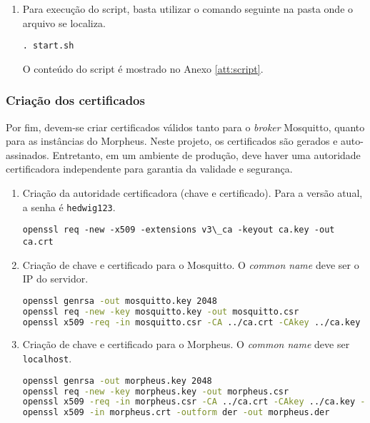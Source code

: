 \begin{enumerate}
\textbf{passwd}

\begin{lstlisting}[language=bash]
    0002D3D7:135876
    01344682:374028
    000750A1:524708
    001A1B07:321115
    0014BB3E:147203
    asd561asd5asd984faee:852456987
\end{lstlisting}

\item Para execução do script, basta utilizar o comando seguinte na pasta onde o arquivo se localiza.

\lstinline{. start.sh}

O conteúdo do script é mostrado no Anexo \ref{att:script}.
\end{enumerate}

\subsubsection{Criação dos certificados}

Por fim, devem-se criar certificados válidos tanto para o \emph{broker} Mosquitto, quanto para as instâncias do Morpheus. Neste projeto, os certificados são gerados e auto-assinados. Entretanto, em um ambiente de produção, deve haver uma autoridade certificadora independente para garantia da validade e segurança.

\begin{enumerate}
\item
Criação da autoridade certificadora (chave e certificado). Para a versão atual, a senha é \texttt{hedwig123}.

\lstinline{openssl req -new -x509 -extensions v3\_ca -keyout ca.key -out ca.crt}
\item
Criação de chave e certificado para o Mosquitto. O \emph{common name} deve ser o IP do servidor.

\begin{lstlisting}[language=bash]
openssl genrsa -out mosquitto.key 2048
openssl req -new -key mosquitto.key -out mosquitto.csr
openssl x509 -req -in mosquitto.csr -CA ../ca.crt -CAkey ../ca.key -CAcreateserial -out mosquitto.crt -days 3650 -sha256
\end{lstlisting}

\item
Criação de chave e certificado para o Morpheus. O \emph{common name} deve ser \texttt{localhost}.

\begin{lstlisting}[language=bash]
openssl genrsa -out morpheus.key 2048
openssl req -new -key morpheus.key -out morpheus.csr
openssl x509 -req -in morpheus.csr -CA ../ca.crt -CAkey ../ca.key -CAcreateserial -out morpheus.crt -days 3650 -sha256 -addtrust clientAuth
openssl x509 -in morpheus.crt -outform der -out morpheus.der
\end{lstlisting}
\end{enumerate}

